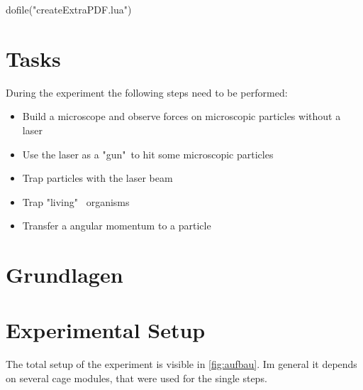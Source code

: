 \documentclass[12pt,english,ngerman]{scrartcl}
\begin{document}
\begin{luacode*}
dofile("createExtraPDF.lua")
\end{luacode*}

% 
\tableofcontents

\newpage

\section{Tasks}\label{Auf}

During the experiment the following steps need to be performed:

\begin{itemize}
	\item Build a microscope and observe forces on microscopic particles without a laser
	\item Use the laser as a "gun"\  to hit some microscopic particles
	\item Trap particles with the laser beam
	\item Trap "living" \ organisms
	\item Transfer a angular momentum to a particle
\end{itemize}

\section{Grundlagen}\label{Grund}


\section{Experimental Setup}\label{sec:versuchsanordnung}

The total setup of the experiment is visible in \autoref{fig:aufbau}. Im general it depends on several cage modules, 
that were used for the single steps.
\end{document}
